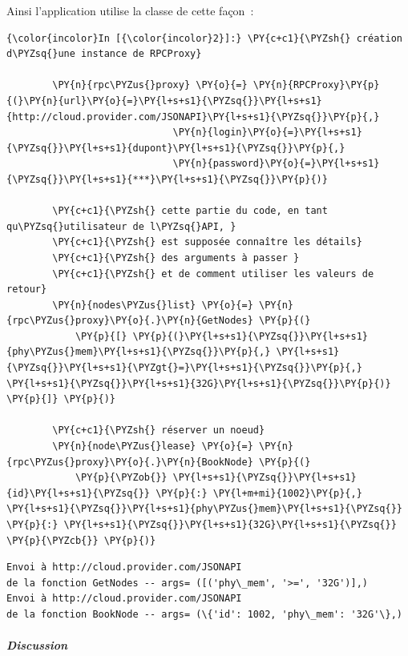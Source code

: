     Ainsi l'application utilise la classe de cette façon~:

    \begin{Verbatim}[commandchars=\\\{\}]
{\color{incolor}In [{\color{incolor}2}]:} \PY{c+c1}{\PYZsh{} création d\PYZsq{}une instance de RPCProxy}
        
        \PY{n}{rpc\PYZus{}proxy} \PY{o}{=} \PY{n}{RPCProxy}\PY{p}{(}\PY{n}{url}\PY{o}{=}\PY{l+s+s1}{\PYZsq{}}\PY{l+s+s1}{http://cloud.provider.com/JSONAPI}\PY{l+s+s1}{\PYZsq{}}\PY{p}{,} 
                             \PY{n}{login}\PY{o}{=}\PY{l+s+s1}{\PYZsq{}}\PY{l+s+s1}{dupont}\PY{l+s+s1}{\PYZsq{}}\PY{p}{,}
                             \PY{n}{password}\PY{o}{=}\PY{l+s+s1}{\PYZsq{}}\PY{l+s+s1}{***}\PY{l+s+s1}{\PYZsq{}}\PY{p}{)}
        
        \PY{c+c1}{\PYZsh{} cette partie du code, en tant qu\PYZsq{}utilisateur de l\PYZsq{}API, }
        \PY{c+c1}{\PYZsh{} est supposée connaître les détails}
        \PY{c+c1}{\PYZsh{} des arguments à passer }
        \PY{c+c1}{\PYZsh{} et de comment utiliser les valeurs de retour}
        \PY{n}{nodes\PYZus{}list} \PY{o}{=} \PY{n}{rpc\PYZus{}proxy}\PY{o}{.}\PY{n}{GetNodes} \PY{p}{(} 
            \PY{p}{[} \PY{p}{(}\PY{l+s+s1}{\PYZsq{}}\PY{l+s+s1}{phy\PYZus{}mem}\PY{l+s+s1}{\PYZsq{}}\PY{p}{,} \PY{l+s+s1}{\PYZsq{}}\PY{l+s+s1}{\PYZgt{}=}\PY{l+s+s1}{\PYZsq{}}\PY{p}{,} \PY{l+s+s1}{\PYZsq{}}\PY{l+s+s1}{32G}\PY{l+s+s1}{\PYZsq{}}\PY{p}{)} \PY{p}{]} \PY{p}{)}
        
        \PY{c+c1}{\PYZsh{} réserver un noeud}
        \PY{n}{node\PYZus{}lease} \PY{o}{=} \PY{n}{rpc\PYZus{}proxy}\PY{o}{.}\PY{n}{BookNode} \PY{p}{(}
            \PY{p}{\PYZob{}} \PY{l+s+s1}{\PYZsq{}}\PY{l+s+s1}{id}\PY{l+s+s1}{\PYZsq{}} \PY{p}{:} \PY{l+m+mi}{1002}\PY{p}{,} \PY{l+s+s1}{\PYZsq{}}\PY{l+s+s1}{phy\PYZus{}mem}\PY{l+s+s1}{\PYZsq{}} \PY{p}{:} \PY{l+s+s1}{\PYZsq{}}\PY{l+s+s1}{32G}\PY{l+s+s1}{\PYZsq{}} \PY{p}{\PYZcb{}} \PY{p}{)}
\end{Verbatim}


    \begin{Verbatim}[commandchars=\\\{\}]
Envoi à http://cloud.provider.com/JSONAPI
de la fonction GetNodes -- args= ([('phy\_mem', '>=', '32G')],)
Envoi à http://cloud.provider.com/JSONAPI
de la fonction BookNode -- args= (\{'id': 1002, 'phy\_mem': '32G'\},)

    \end{Verbatim}

    \hypertarget{discussion}{%
\subparagraph{Discussion\\\\}\label{discussion}}

